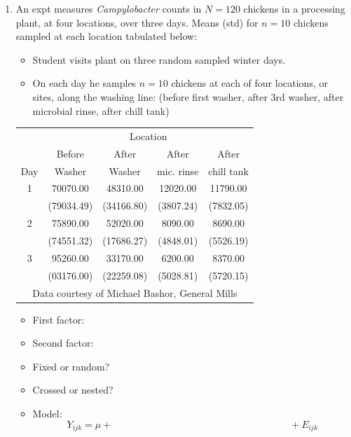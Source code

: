 \begin{enumerate}
\item An expt measures {\em Campylobacter} counts in $N=120$ chickens in a processing plant, at four locations, over three days.  Means (std) for $n=10$ chickens sampled at each location tabulated below:
\begin{itemize}
\item Student visits plant on three random sampled winter days.
\item On each day he samples $n=10$ chickens at each of four locations, or sites, along the washing line: (before first washer, after 3rd washer, after microbial rinse, after chill tank)
\end{itemize}
\begin{center}
\begin{large}
\begin{tabular}{c|cccc}
& \multicolumn{4}{c}{Location} \\
& Before & After & After & After \\
Day & Washer & Washer & mic. rinse & chill tank \\ \hline
 1       &       70070.00      &      48310.00      &      12020.00      &      11790.00 \\
         &      (79034.49)     &     (34166.80)     &      (3807.24)     &      (7832.05)\\
 2       &       75890.00      &      52020.00      &       8090.00      &       8690.00 \\
         &      (74551.32)     &     (17686.27)     &      (4848.01)     &      (5526.19) \\
 3       &       95260.00      &      33170.00      &       6200.00      &       8370.00 \\
         &      (03176.00)     &     (22259.08)     &      (5028.81)     &      (5720.15) \\ \hline
\multicolumn{5}{c}{Data courtesy of Michael Bashor, General Mills } \\
\end{tabular}
\end{large}
\end{center}

\begin{itemize}
\item First factor:
\item Second factor:
\item Fixed or random?
\item Crossed or nested?
\item Model:  
$$Y_{ijk} = \mu + \hspace{3in} + E_{ijk}$$
\end{itemize}


\end{enumerate}
